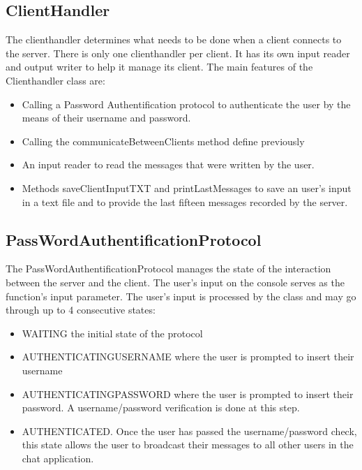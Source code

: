 \documentclass[11pt,letterpaper]{article}
\begin{document}
\subsection{ClientHandler}
The clienthandler determines what needs to be done when a client connects to the server. There is only one clienthandler per client. It has its own input reader and output writer to help it manage its client. The main features of the Clienthandler class are:
\begin{itemize}
  \item Calling a Password Authentification protocol to authenticate the user by the means of their username and password.
  \item Calling the communicateBetweenClients method define previously
  \item An input reader to read the messages that were written by the user.
  \item Methods saveClientInputTXT and printLastMessages to save an user's input in a text file and to provide the last fifteen messages recorded by the server.
\end{itemize}

\subsection{PassWordAuthentificationProtocol}
The PassWordAuthentificationProtocol manages the state of the interaction between the server and the client. The user's input on the console serves as the function's input parameter. The user's input is processed by the class and may go through up to 4 consecutive states:

\begin{itemize}
  \item WAITING the initial state of the protocol
  \item AUTHENTICATINGUSERNAME  where the user is prompted to insert their username
  \item AUTHENTICATINGPASSWORD where the user is prompted to insert their password. A username/password verification is done at this step. 
  \item AUTHENTICATED. Once the user has passed the username/password check, this state allows the user to broadcast their messages to all other users in the chat application.
\end{itemize}

\end{document}
